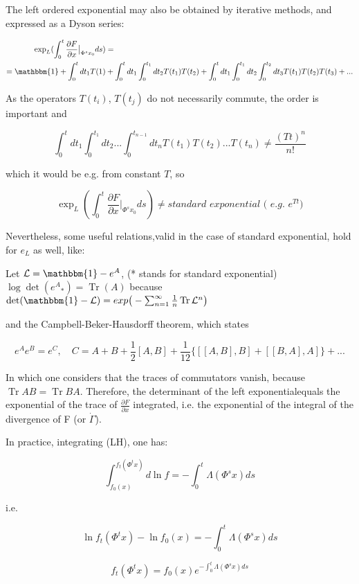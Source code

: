 \documentclass{article}
\DeclareMathOperator{\tr}{Tr}
\begin{document}
The left ordered exponential may also be obtained by iterative methods, and expressed as a Dyson series:

\begin{align*}
\exp_L ({\int_{0}^{t} \frac{\partial F}{\partial x} \big |_{\Phi^s x_0} ds}) &=\\ 
 = \mathbbm{1} + \int_{0}^{t} dt_1 T(1) &+ \int_{0}^{t} dt_1 \int_{0}^{t_1} dt_2 T(t_1) T(t_2) + \int_{0}^{t} dt_1 \int_{0}^{t_1} dt_2 \int_{0}^{t_2} dt_3 T(t_1) T(t_2)  T(t_3) + ...
\end{align*}

As the operators $T(t_i)$, $T(t_j)$ do not necessarily commute, the order is important and

$$\int_{0}^{t} dt_1 \int_{0}^{t_1} dt_2 ... \int_{0}^{t_{n-1}} dt_n T(t_1) T(t_2) ... T(t_n) \neq \frac{(Tt)^n}{n!}$$

which it would be e.g. from constant $T$, so

$$\exp_L({\int_{0}^{t} \frac{\partial F}{\partial x} \big |_{\Phi^s x_0} ds}) \neq \textit{standard exponential ( e.g. } e^{Tt} \textit{)}$$

Nevertheless, some useful relations,valid in the case of standard exponential, hold for $e_L$ as well, like:

Let $\mathcal{L} = \mathbbm{1}-e^A$, (* stands for standard exponential) $\log \det ({e^A}_*) = \tr(A)$ because $\det(\mathbbm{1}-\mathcal{L}) = exp \big ( - \sum_{n=1}^{\infty} \frac{1}{n} \tr \mathcal{L}^n \big )$

and the Campbell-Beker-Hausdorff theorem, which states

$$e^A e^B = e^C, \quad C = A + B +\frac{1}{2}[A,B]+\frac{1}{12} \{ [[A,B],B]+[[B,A],A] \} + ...$$

In which one considers that the traces of commutators vanish, because $\tr AB = \tr BA$. Therefore, the determinant of the left exponentialequals the exponential of the trace of $ \frac{\partial F}{\partial x}$ integrated, i.e. the exponential of the integral of the divergence of F (or $\dot{\Gamma}$).

In practice, integrating (LH), one has:

$$ \int_{f_0(x)}^{f_t(\Phi^t x)} d \ln f = - \int_{0}^{t} \Lambda(\Phi^s x) ds$$

i.e.

$$ \ln f_t(\Phi^t x) - \ln f_0(x) =  - \int_{0}^{t} \Lambda(\Phi^s x) ds $$

$$ f_t(\Phi^t x) =  f_0(x) e^{ - \int_{0}^{t} \Lambda(\Phi^s x) ds }$$
\end{document}
